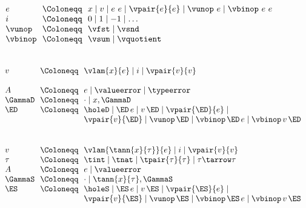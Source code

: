 \begin{flushleft}

\begin{minipage}[t]{0.75\columnwidth}
\\
$\begin{array}{l@{~~}c@{~~}l}
  e & \Coloneqq & x \mid v \mid e~e \mid \vpair{e}{e} \mid \vunop~e \mid \vbinop~e~e
\\
  i & \Coloneqq & 0 \mid 1 \mid -1 \mid \ldots
\\
  \vunop & \Coloneqq & \vfst \mid \vsnd
\\
  \vbinop & \Coloneqq & \vsum \mid \vquotient
\end{array}$
\end{minipage}%
\begin{minipage}[t]{0.7\columnwidth}
\\
$\begin{array}{l@{~~}c@{~~}l}
  v & \Coloneqq & \vlam{x}{e} \mid i \mid \vpair{v}{v}
\\ & &
\\
  A & \Coloneqq & e \mid \valueerror \mid \typeerror
\\
  \GammaD & \Coloneqq & \cdot \mid x,\GammaD
\\
  \ED & \Coloneqq & \holeD \mid \ED\,e \mid v\,\ED \mid \vpair{\ED}{e} \mid
\\ & & \vpair{v}{\ED} \mid \vunop\,\ED \mid \vbinop\,\ED\,e \mid \vbinop\,v\,\ED
\end{array}$
\end{minipage}%
\begin{minipage}[t]{0.7\columnwidth}
\\
$\begin{array}{l@{~~}c@{~~}l}
  v & \Coloneqq & \vlam{\tann{x}{\tau}}{e} \mid i \mid \vpair{v}{v}
\\
  \tau & \Coloneqq & \tint \mid \tnat \mid \tpair{\tau}{\tau} \mid \tau \tarrow \tau
\\
  A & \Coloneqq & e \mid \valueerror
\\
  \GammaS & \Coloneqq & \cdot \mid \tann{x}{\tau},\GammaS
\\
  \ES & \Coloneqq & \holeS \mid \ES\,e \mid v\,\ES \mid \vpair{\ES}{e} \mid
\\ & & \vpair{v}{\ES} \mid \vunop\,\ES \mid \vbinop\,\ES\,e \mid \vbinop\,v\,\ES
\end{array}$
\end{minipage}

\medskip
\begin{minipage}[t]{\columnwidth}
\begin{mathpar}


\end{mathpar}
\end{minipage}
\end{flushleft}
